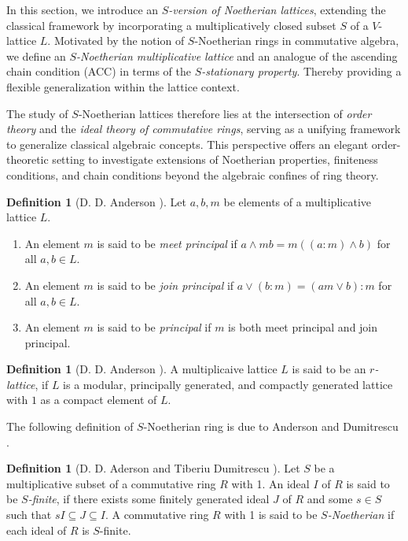 \documentclass[10pt,twoside,a4]{amsart}
\numberwithin{equation}{section}
\theoremstyle{plain}
\theoremstyle{definition}
\newtheorem{defn}[lem]{Definition}
\begin{document}
In this section, we introduce an \textit{$S$-version of Noetherian lattices}, extending the classical framework by incorporating a multiplicatively closed subset $S$ of a $V$-lattice $L$. Motivated by the notion of  \linebreak $S$-Noetherian rings in commutative algebra, we define an \textit{$S$-Noetherian multiplicative lattice} and an analogue of the ascending chain condition (ACC) in terms of the \textit{$S$-stationary property}. Thereby providing a flexible generalization  within the lattice context.

The study of $S$-Noetherian  lattices therefore lies at the intersection of \textit{order theory} and the \textit{ideal theory of commutative rings}, serving as a unifying framework to generalize classical algebraic concepts. This perspective offers an elegant order-theoretic setting to investigate extensions of Noetherian properties, finiteness conditions, and chain conditions beyond the algebraic confines of ring theory.



\begin{defn}[D. D. Anderson \cite{A}]
	Let $a, b, m$ be elements of a multiplicative lattice $L$. 
	\begin{enumerate}
		\item An element $m$ is said to be\textit{ meet principal} if $a \wedge mb = m((a:m) \wedge b)$ for all $a,b \in L$.
		\item An element $m$ is said to be \textit{join principal} if $a \vee (b :m) = (am \vee b): m$ for all $a,b \in L$.
		\item An element $m$ is said to be  \textit{principal} if $m$ is both meet principal and join principal.
	\end{enumerate}
	
\end{defn}

\begin{defn} [D. D. Anderson \cite{A}]
	A multiplicaive lattice $L$ is said to be an \textit{$r$-lattice}, if  $L$ is a modular, principally generated, and compactly generated lattice with $1$ as a compact element of $L$. 
\end{defn}

The following definition of $S$-Noetherian ring is due to Anderson and Dumitrescu \cite{AT}. 

\begin{defn} [D. D. Aderson and Tiberiu Dumitrescu \cite{AT}]
	Let $S$ be a multiplicative subset of a commutative ring $R$ with 1. An ideal $I$ of $R$ is said to be \textit{$S$-finite}, if there exists some finitely generated ideal $J$ of $R$ and some $s \in S$ such that $sI \subseteq J \subseteq I$. A commutative ring $R$ with 1 is said to be \textit{$S$-Noetherian} if each ideal of $R$ is $S$-finite.  
\end{defn}
\end{document}
